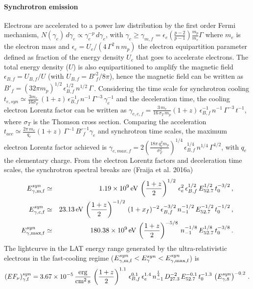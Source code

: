 \documentclass[11pt,twoside]{article}
\newcommand{\be}{\begin{equation}}
\newcommand{\ee}{\end{equation}}
\newcommand{\bary}{\begin{eqnarray}}
\newcommand{\eary}{\end{eqnarray}}
\begin{document}
\paragraph{Synchrotron emission}
%
Electrons are accelerated to a power law distribution by the first order Fermi mechanism,  $N(\gamma_e)\,d\gamma_e \propto \gamma_e^{-p}\,d\gamma_e$, with $\gamma_e\geq\gamma_{m,f}=\epsilon_{e}\left(\frac {p-2} {p-1}\right) \frac {m_p} {m_e}\Gamma$  where  $m_e$ is the electron mass and $\epsilon_{e}=  U_e/(4\,\Gamma^2\,n\,m_p) $ the electron equipartition parameter defined as fraction of the energy density $U_e$ that goes to accelerate electrons.   The total energy density ($U$) is also equipartitioned to amplify the magnetic field  $\epsilon_{B,f}=U_{B,f}/U$ (with $U_{B,f}=B'^2_f/8\pi$), hence the magnetic field   can be written as $B'_f=(32\pi m_p)^{1/2}\,\epsilon^{1/2}_{B,f}\,n^{1/2}\,\Gamma\,$.
%
%
Considering the time scale  for synchrotron cooling $t_{e,syn}\simeq \frac{3m_e}{16\sigma_T}\,(1+z)\,\epsilon^{-1}_{B,f}\,n^{-1}\,\Gamma^{-3}\,\gamma_e^{-1}$ and the deceleration time, the cooling electron Lorentz factor can be written as $\gamma_{e,c,f}=\frac{3\,m_e}{16\,\sigma_T\,m_p}(1+z)\,\epsilon^{-1}_{B,f}\,n^{-1}\,\Gamma^{-3}\,t^{-1}$,   where $\sigma_T$ is the Thomson cross section. Comparing  the acceleration  $t_{acc}\simeq \frac{2\pi\,m_e}{q_e}(1+z)\,\Gamma^{-1}\,{B'}^{-1}_f \gamma_e$ and synchrotron time scales, the maximum electron Lorentz factor achieved is $\gamma_{e,max,f}=2 \left(\frac{18\pi\, q_e^2 m_p}{\sigma^2_T}\right)^{1/4}\,\epsilon^{1/4}_{B,f}\,n^{1/4}\,\Gamma^{1/2}$, with $q_e$ the elementary charge. From the electron Lorentz factors and deceleration time scales,  the synchrotron spectral breaks  are (Fraija et al. 2016a)
%
\bary\label{synfor_b}
E^{syn}_{\rm \gamma,m,f}&\simeq&1.19\times 10^9\,{\rm eV}  \, \left(\frac{1+z}{2}\right)^{1/2}\,\epsilon_{e}^2\,\epsilon^{1/2}_{B,f}\,E^{1/2}_{52.7}\,t^{-3/2}_0\,,\cr
E^{syn}_{\rm \gamma,c,f}&\simeq& 23.13\,{\rm eV} \, \left(\frac{1+z}{2}\right)^{-1/2}\,(1+x_f )^{-2}\,\epsilon^{-3/2}_{B,f}\,n^{-1/2}_{-1}\, E^{-1/2}_{52.7}\,t^{-1/2}_0\,,\cr
E^{syn}_{\rm \gamma,max,f}&\simeq& 180.38\times 10^9\,{\rm eV}\, \left(\frac{1+z}{2}\right)^{-5/8}\, n^{-1/8}_{-1}\,E^{1/8}_{52.7}\,t^{-3/8}_0\,.
\eary
% 
The lightcurve in the LAT energy range generated by the ultra-relativistic electrons in the fast-cooling regime ($E^{syn}_{\rm \gamma,m,f}<E^{syn}_\gamma<E^{syn}_{\rm \gamma,max,f}$) is
%
\begin{equation}
\label{fcsyn_t}
(EF_{\nu})^{syn}_{\rm \gamma,f}=3.67\times 10^{-5}\,{\rm \frac{erg}{cm^2\,s}}\, \left(\frac{1+z}{2} \right)^{1.1}\,\epsilon_{B,f}^{0.1}\,\epsilon_{e}^{1.4}\,n^\frac14_{-1}\,D^{-2}_{27.3}\,E^{-0.1}_{52.7}\,t^{-1.3}_0\,\left(E^{syn}_{\gamma,8} \right)^{-0.2}\,.
\end{equation}
%  
%
\end{document}
